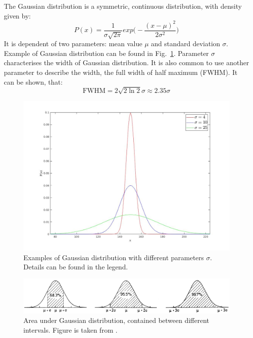 \documentclass[12pt,a4paper]{report}
\begin{document}
The Gaussian distribution is a symmetric, continuous distribution, with density given by:
\begin{equation} \label{gauss_dist}
P(x) = \frac{1}{\sigma \sqrt{2\pi}}exp\Big ( - \frac{(x-\mu)^2}{2\sigma^2} \Big )
\end{equation}
It is dependent of two parameters: mean value $\mu$ and standard deviation $\sigma$. Example of Gaussian distribution can be found in Fig.~\ref{fig:Gaussian}. Parameter $\sigma$ characterises the width of Gaussian distribution. It is also common to use another parameter to describe the width, the full width of half maximum (FWHM). It can be shown, that:
\begin{equation} \label{FWHM}
\text{FWHM} = 2 \sqrt{2\ln 2}\sigma \approx 2.35 \sigma
\end{equation}
\begin{figure}[!t]
\begin{center}
\includegraphics*[scale = 0.4]{Figures/Gauss}
\caption{\label{fig:Gaussian} Examples of Gaussian distribution with different parameters $\sigma$. Details can be found in the legend.}
\end{center}
\end{figure}
\begin{figure}[!t]
\begin{center}
\includegraphics*[scale = 0.3]{Figures/Gauss_intervals}
\caption{\label{fig:Gauss_intervals} Area under Gaussian distribution, contained between different intervals. Figure is taken from \cite{stat_2}.}
\end{center}
\end{figure}
\end{document}
